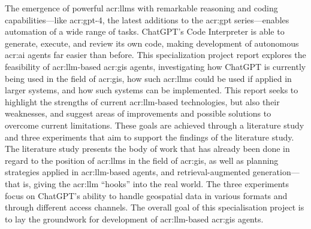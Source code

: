 The emergence of powerful \glspl{acr:llm} with remarkable reasoning and coding capabilities---like \acrshort{acr:gpt}-4, the latest additions to the \acrshort{acr:gpt} series---enables automation of a wide range of tasks. ChatGPT's Code Interpreter is able to generate, execute, and review its own code, making development of autonomous \acrshort{acr:ai} agents far easier than before. This specialization project report explores the feasibility of \gls{acr:llm}-based \acrshort{acr:gis} agents, investigating how ChatGPT is currently being used in the field of \acrshort{acr:gis}, how such \glspl{acr:llm} could be used if applied in larger systems, and how such systems can be implemented. This report seeks to highlight the strengths of current \gls{acr:llm}-based technologies, but also their weaknesses, and suggest areas of improvements and possible solutions to overcome current limitations. These goals are achieved through a literature study and three experiments that aim to support the findings of the literature study. The literature study presents the body of work that has already been done in regard to the position of \glspl{acr:llm} in the field of \acrshort{acr:gis}, as well as planning strategies applied in \gls{acr:llm}-based agents, and retrieval-augmented generation---that is, giving the \gls{acr:llm} \enquote{hooks} into the real world. The three experiments focus on ChatGPT's ability to handle geospatial data in various formats and through different access channels. The overall goal of this specialisation project is to lay the groundwork for development of \gls{acr:llm}-based \acrshort{acr:gis} agents.

\glsresetall

